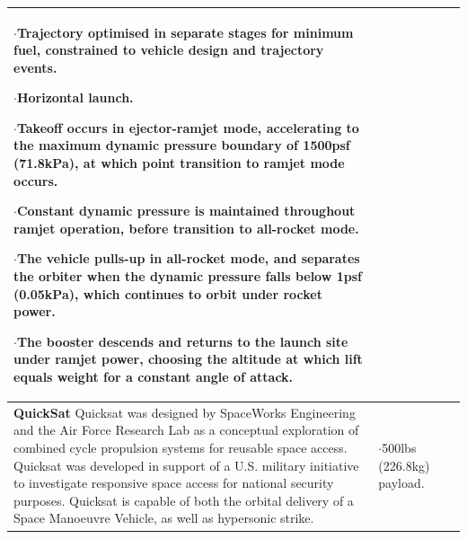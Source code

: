 {\begin{landscape}
\begin{xltabular}{\linewidth}{|X|X|X|}
	$\cdot$Trajectory optimised in separate stages for minimum fuel, constrained to vehicle design and trajectory events. 
	
	$\cdot$Horizontal launch.
	
	$\cdot$Takeoff occurs in ejector-ramjet mode, accelerating to the maximum dynamic pressure boundary of 1500psf (71.8kPa), at which point transition to ramjet mode occurs. 
	
	$\cdot$Constant dynamic pressure is maintained throughout ramjet operation, before transition to all-rocket mode.
	
	$\cdot$The vehicle pulls-up in all-rocket mode, and separates the orbiter when the dynamic pressure falls below 1psf (0.05kPa), which continues to orbit under rocket power.
	
	$\cdot$The booster descends and returns to the launch site under ramjet power, choosing the altitude at which lift equals weight for a constant angle of attack. 
	
	\\
	\hline \small 
	\textbf{QuickSat}\cite{Eklund2012}\newline\newline
Quicksat was designed by SpaceWorks Engineering and the Air Force Research Lab as a conceptual exploration of combined cycle propulsion systems for reusable space access. Quicksat was developed in support of a U.S. military initiative to investigate responsive space access for national security purposes. Quicksat is capable of both the orbital delivery of a Space Manoeuvre Vehicle, as well as hypersonic strike. 
	&\small
	
	$\cdot$500lbs (226.8kg) payload. 
	

\end{xltabular}
\end{landscape}}
